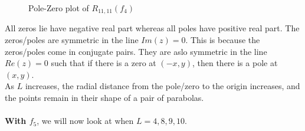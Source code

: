 \documentclass[10pt]{article}
\begin{document}
\begin{figure}[H]
\begin{minipage}[b]{0.47\linewidth}
    \caption{Pole-Zero plot of $R_{11,11}(f_4)$}
        \end{minipage}
\end{figure}
\noindent All zeros lie have negative real part whereas all poles have positive real part. The zeros/poles are symmetric in the line $Im(z)=0$. This is because the zeros/poles come in conjugate pairs. They are aslo symmetric in the line $Re(z)=0$ such that if there is a zero at $(-x,y)$, then there is a pole at $(x,y)$.\\
As $L$ increases, the radial distance from the pole/zero to the origin increases, and the points remain in their shape of a pair of parabolas.\\\\

\noindent \textbf{With $f_5$}, we will now look at when $L=4,8,9,10$.
\end{document}
